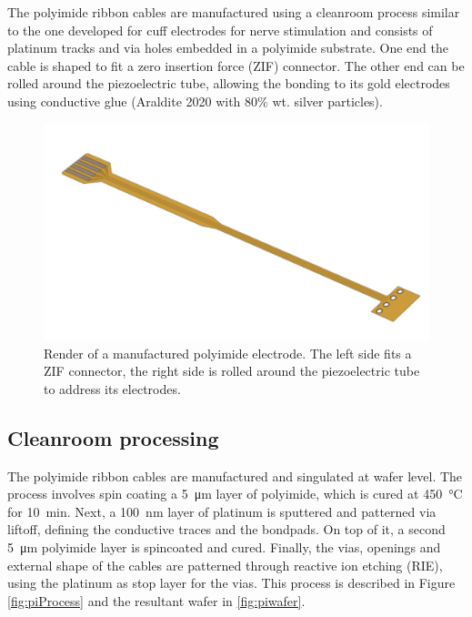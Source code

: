 The polyimide ribbon cables are manufactured using a cleanroom process similar to the one developed for cuff electrodes for nerve stimulation \cite{Rodriguez2000} and consists of platinum tracks and via holes embedded in a polyimide substrate. One end the cable is shaped to fit a zero insertion force (ZIF) connector. The other end can be rolled around the piezoelectric tube, allowing the bonding to its gold electrodes using conductive glue (Araldite 2020 with 80\% wt. silver particles).

\begin{figure}[h!]\centering \includegraphics[width=15cm]{figures/40_Fabrication/PI/render.JPG}
      \caption{Render of a manufactured polyimide electrode. The left side fits a ZIF connector, the right side is rolled around the piezoelectric tube to address its electrodes.}
      \label{fig:piRender}
\end{figure}



\subsection{Cleanroom processing}
The polyimide ribbon cables are manufactured and singulated at wafer level. The process involves spin coating a \SI{5}{\micro\meter} layer of polyimide, which is cured at \SI{450}{\celsius} for \SI{10}{\minute}. Next, a \SI{100}{\nano\meter} layer of platinum is sputtered and patterned via liftoff, defining the conductive traces and the bondpads. On top of it, a second \SI{5}{\micro\meter} polyimide layer is spincoated and cured. Finally, the vias, openings and external shape of the cables are patterned through reactive ion etching (RIE), using the platinum as stop layer for the vias. This process is described in Figure \ref{fig:piProcess} and the resultant wafer in \autoref{fig:piwafer}.


